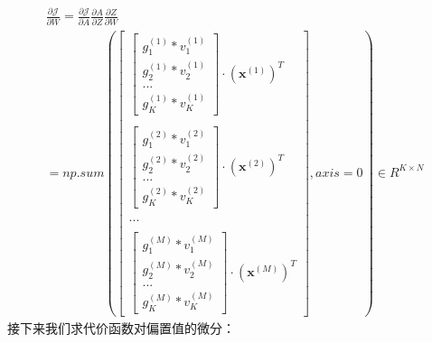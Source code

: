 \documentclass[UTF8]{article}
\begin{document}
\begin{equation}
\begin{aligned}
\frac{\partial{\mathcal{J}}}{\partial{W}}=\frac{\partial{\mathcal{J}}}{\partial{A}} \frac{\partial{A}}{\partial{Z}} \frac{\partial{Z}}{\partial{W}} \\
 =np.sum(\begin{bmatrix}
  \begin{bmatrix}
 g_{1}^{(1)}*v_{1}^{(1)} \\
 g_{2}^{(1)}*v_{2}^{(1)} \\
 ... \\
 g_{K}^{(1)}*v_{K}^{(1)}
 \end{bmatrix} \cdot (\boldsymbol{x}^{(1)})^{T} \\ \\
\begin{bmatrix}
 g_{1}^{(2)}*v_{1}^{(2)} \\
 g_{2}^{(2)}*v_{2}^{(2)} \\
 ... \\
 g_{K}^{(2)}*v_{K}^{(2)}
 \end{bmatrix} \cdot (\boldsymbol{x}^{(2)})^{T} \\ \\
 ... \\ \\
 \begin{bmatrix}
 g_{1}^{(M)}*v_{1}^{(M)} \\
 g_{2}^{(M)}*v_{2}^{(M)} \\
 ... \\
 g_{K}^{(M)}*v_{K}^{(M)}
 \end{bmatrix}\cdot (\boldsymbol{x}^{(M)})^{T}
\end{bmatrix}, axis=0) \in R^{K \times N}
\end{aligned}
\label{mlp-leaky-relu-pJ-pW-def}
\end{equation}
接下来我们求代价函数对偏置值的微分：
\end{document}
